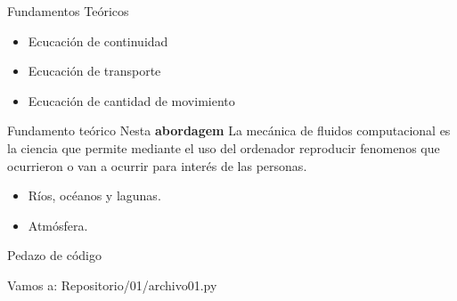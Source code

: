 \begin{frame}{Fundamentos Teóricos}
\begin{itemize}
    \item Ecucación de continuidad
    \item Ecucación de transporte
    \item Ecucación de cantidad de movimiento
\end{itemize}
    
\end{frame}

\begin{frame}{Fundamento teórico}
Nesta \textbf{abordagem} La mecánica de fluidos computacional es la ciencia que permite mediante el uso del ordenador reproducir fenomenos que ocurrieron o van a ocurrir para interés de las personas.
\medskip

\begin{itemize}
    \item Ríos, océanos y lagunas.
    \medskip
    \item Atmósfera.
\end{itemize}    

\end{frame}

\begin{frame}{Pedazo de código}

Vamos a:
Repositorio/01/archivo01.py



\end{frame}